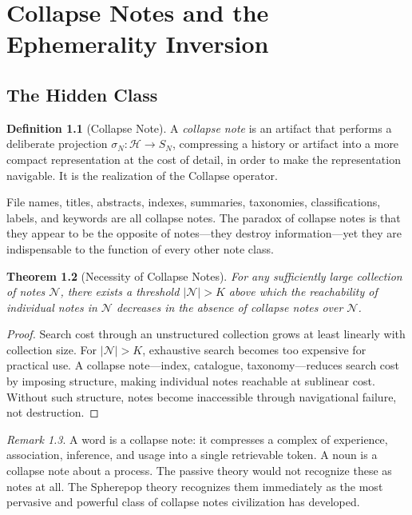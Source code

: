 \documentclass[12pt, a4paper, openany]{book}
\theoremstyle{plain}
\newtheorem{theorem}{Theorem}[chapter]
\theoremstyle{definition}
\newtheorem{definition}[theorem]{Definition}
\theoremstyle{remark}
\newtheorem{remark}[theorem]{Remark}
\newcommand{\calH}{\mathcal{H}}
\newcommand{\calN}{\mathcal{N}}
\begin{document}
\chapter{Collapse Notes and the Ephemerality Inversion}

\section{The Hidden Class}

\begin{definition}[Collapse Note]
A \emph{collapse note} is an artifact that performs a deliberate projection
$\sigma_N : \calH \to S_N$, compressing a history or artifact into a more compact
representation at the cost of detail, in order to make the representation
navigable. It is the realization of the Collapse operator.
\end{definition}

File names, titles, abstracts, indexes, summaries, taxonomies, classifications,
labels, and keywords are all collapse notes. The paradox of collapse notes is that
they appear to be the opposite of notes---they destroy information---yet they are
indispensable to the function of every other note class.

\begin{theorem}[Necessity of Collapse Notes]
For any sufficiently large collection of notes $\calN$, there exists a threshold
$|\calN| > K$ above which the reachability of individual notes in $\calN$ decreases
in the absence of collapse notes over $\calN$.
\end{theorem}

\begin{proof}
Search cost through an unstructured collection grows at least linearly with
collection size. For $|\calN| > K$, exhaustive search becomes too expensive for
practical use. A collapse note---index, catalogue, taxonomy---reduces search cost
by imposing structure, making individual notes reachable at sublinear cost.
Without such structure, notes become inaccessible through navigational failure,
not destruction.
\end{proof}

\begin{remark}
A word is a collapse note: it compresses a complex of experience, association,
inference, and usage into a single retrievable token. A noun is a collapse note
about a process. The passive theory would not recognize these as notes at all.
The Spherepop theory recognizes them immediately as the most pervasive and powerful
class of collapse notes civilization has developed.
\end{remark}
\end{document}
